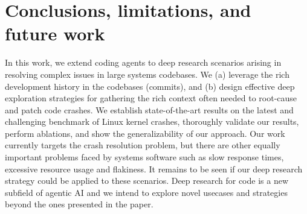 \section{Conclusions, limitations, and future work}
\label{sec:conclusion}
In this work, we extend coding agents to deep research scenarios arising in resolving complex issues in large systems codebases.
We (a) leverage the rich development history in the codebases (commits), and (b) design effective deep exploration strategies for gathering the rich context often needed to root-cause and patch code crashes.
We establish state-of-the-art results on the latest and challenging benchmark of Linux kernel crashes, thoroughly validate our results, perform ablations, and show the generalizability of our approach.
Our work currently targets the crash resolution problem, but there are other equally important problems faced by systems software such as slow response times, excessive resource usage and flakiness. It remains to be seen if our deep research strategy could be applied to these scenarios. Deep research for code is a new subfield of agentic AI and we intend to explore novel usecases and strategies beyond the ones presented in the paper.
